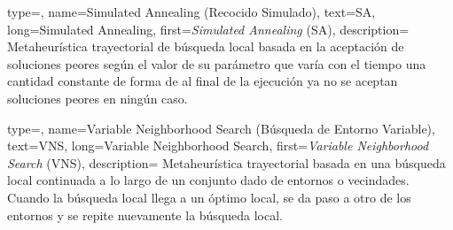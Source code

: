 {
    type=\acronymtype, %
    name={Simulated Annealing (Recocido Simulado)}, %
    text={SA}, %
	 long={Simulated Annealing}, %
    first={\textit{Simulated Annealing} (SA)}, %
    description= 
    {   
        Metaheurística trayectorial de búsqueda local basada en la aceptación de soluciones peores según el valor de su parámetro que varía con el tiempo una cantidad constante de forma de al final de la ejecución ya no se aceptan soluciones peores en ningún caso. %
    }
}

{
	type=\acronymtype, %
	name={Variable Neighborhood Search (Búsqueda de Entorno Variable)}, %
	text={VNS}, %
	long={Variable Neighborhood Search}, %
	first={\textit{Variable Neighborhood Search} (VNS)}, %
	description= 
	{   
		Metaheurística trayectorial basada en una búsqueda local continuada a lo largo de un conjunto dado de entornos o vecindades. Cuando la búsqueda local llega a un óptimo local, se da paso a otro de los entornos y se repite nuevamente la búsqueda local.
	}
}